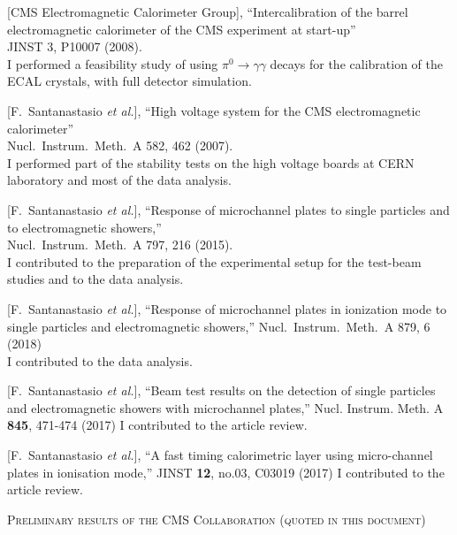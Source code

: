 \documentclass[10pt, a4paper]{article}
\begin{document}
\begin{thebibliography}{599}
[CMS Electromagnetic Calorimeter Group],
``Intercalibration of the barrel electromagnetic calorimeter of the CMS  experiment at start-up''\\
JINST 3, P10007 (2008).
\\ I performed a feasibility study of using $\pi^0 \rightarrow \gamma \gamma$ decays for the calibration of the ECAL crystals, with full detector simulation.

 [F.~Santanastasio {\it et al.}],
``High voltage system for the CMS electromagnetic calorimeter''\\
 Nucl.\ Instrum.\ Meth.\  A 582, 462 (2007).
 \\ I performed part of the stability tests on the high voltage boards at CERN laboratory and most of the data analysis. 

[F.~Santanastasio {\it et al.}],
  ``Response of microchannel plates to single particles and to electromagnetic showers,''\\
Nucl.\ Instrum.\ Meth.\ A 797, 216 (2015).\\
I contributed to the preparation of the experimental setup for the
test-beam studies and to the data analysis.

[F.~Santanastasio {\it et al.}],
  ``Response of microchannel plates in ionization mode to single particles and electromagnetic showers,''
  Nucl.\ Instrum.\ Meth.\ A  879, 6 (2018)\\
I contributed to the data analysis.

[F.~Santanastasio {\it et al.}],
``Beam test results on the detection of single particles and electromagnetic showers with microchannel plates,''
Nucl. Instrum. Meth. A \textbf{845}, 471-474 (2017)
I contributed to the article review.

[F.~Santanastasio {\it et al.}],
``A fast timing calorimetric layer using micro-channel plates in ionisation mode,''
JINST \textbf{12}, no.03, C03019 (2017)
I contributed to the article review.


\vspace{0.1cm} \begin{center} \textsc{Preliminary results of the CMS
    Collaboration (quoted in this document)} \end{center} \vspace{0.05cm}


\end{thebibliography}
\end{document}
